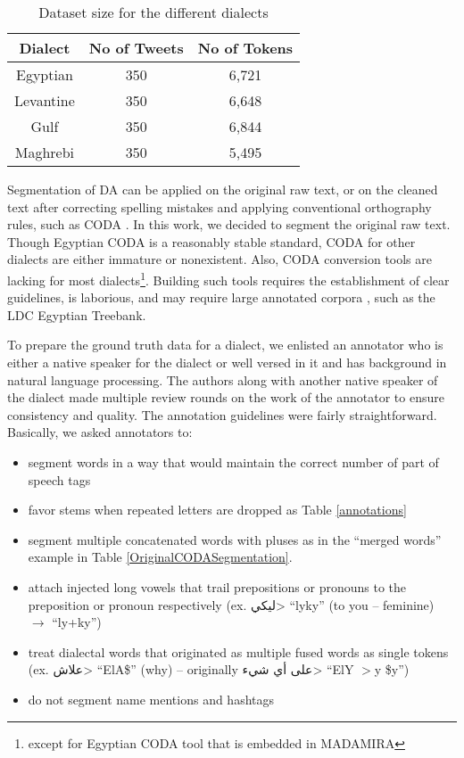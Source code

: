 \documentclass[11pt,letterpaper]{article}
\begin{document}
\begin{table}[h]
\begin{center}
\begin{tabular}{c|c|c}
Dialect & No of Tweets & No of Tokens \\ \hline
Egyptian & 350 & 6,721 \\
Levantine & 350 &  6,648 \\
Gulf & 350 & 6,844 \\
Maghrebi & 350 & 5,495 \\ \hline
\end{tabular}
\label{table:annotatedData}
\caption{Dataset size for the different dialects}
\end{center}
\vspace{-.75em}
\end{table}


Segmentation of DA can be applied on the original raw text, or on the cleaned text after correcting spelling mistakes and applying conventional orthography rules, such as CODA \cite{habash2012conventional}.  In this work, we decided to segment the original raw text.   Though Egyptian CODA is a reasonably stable standard, CODA for other dialects are either immature or nonexistent. Also, CODA conversion tools are lacking for most dialects\footnote{except for Egyptian CODA tool that is embedded in MADAMIRA}. Building such tools requires the establishment of clear guidelines, is laborious, and may require large annotated corpora \cite{eskander2013processing}, such as the LDC Egyptian Treebank. 

To prepare the ground truth data for a dialect, we enlisted an annotator who is either a native speaker for the dialect or well versed in it and has background in natural language processing.  The authors along with another native speaker of the dialect made multiple review rounds on the work of the annotator to ensure consistency and quality.  
The annotation guidelines were fairly straightforward. Basically, we asked annotators to:
\begin{itemize}[leftmargin=*]
\setlength\itemsep{-0.3em}
\item segment words in a way that would maintain the correct number of part of speech tags
\item favor stems when repeated letters are dropped as Table \ref{annotations}
\item segment multiple concatenated words with pluses as in the ``merged words'' example in Table \ref{OriginalCODASegmentation}.
\item attach injected long vowels that trail prepositions or pronouns to the preposition or pronoun respectively (ex. \<ليكي> ``lyky'' (to you -- feminine) $\rightarrow$ ``ly+ky'')
\item treat dialectal words that originated as multiple fused words as single tokens (ex. \<علاش> ``ElA\$'' (why) -- originally \<على أي شيء> ``ElY $>$y \$y\textquotesingle '')
\item do not segment name mentions and hashtags
\end{itemize}
\end{document}

